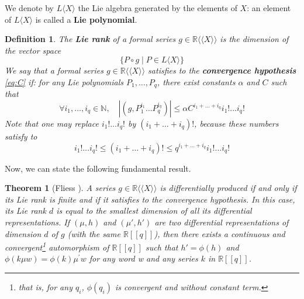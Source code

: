 \documentclass[a4paper,12pt]{article}
\newtheorem*{theorem*}{Theorem}
\newtheorem{definition}{Definition}
\newcommand{\R}{\mathbb{R}}
\newcommand{\N}{\mathbb{N}}
\newcommand{\Lx}{L\langle X\rangle}
\newcommand{\Rxx}{\R\langle\langle X\rangle\rangle}
\begin{document}

We denote by $\Lx$ the Lie algebra generated by the elements of ${X}$: an element of $\Lx$ is called a  \textbf{Lie polynomial}.

\begin{definition}
	The \textbf{Lie rank} of a formal series $g \in \Rxx$ is the dimension of the vector space
	\begin{equation*}
		\{P \circ g \mid P \in \Lx \}
	\end{equation*}
	We say that a formal series $g \in \Rxx$ satisfies to the \textbf{convergence hypothesis} \eqref{eq:C} if: for any Lie polynomials ${P}_1, \ldots, {P}_{{q}}$, there exist constants $\alpha$ and ${C}$ such that
	\begin{equation}
		\tag{C} \label{eq:C}
		\forall i_1, \ldots, i_{{q}} \in \N, \quad \left|\left({g}, {P}_1^{i_1} \ldots {P}_{{q}}^{i_{{q}}}\right)\right| \leq \alpha {C}^{i_1+\ldots+i_{{q}}} {i}_{1} ! \ldots i_q!
	\end{equation}
	Note that one may replace $i_{1} ! \ldots i_{q} !$ by $\left(i_1+\ldots+i_q\right) !$, because these numbers satisfy to
	\begin{equation*}
		i_{1} ! \ldots i_{q} ! \leq\left(i_1+\ldots+i_q\right) ! \leq q^{i_1+\ldots+i_q} i_{1} ! \ldots i_q!
	\end{equation*}
\end{definition}


Now, we can state the following fundamental result. 

\begin{theorem*}[Fliess \cite{5}]
	A series ${g} \in \Rxx$ is differentially produced if and only if its Lie rank is finite and if it satisfies to the convergence hypothesis.
In this case, its Lie rank $d$ is equal to the smallest dimension of all its differential representations. 
	If $(\mu, h)$ and $\left(\mu', h'\right)$ are two differential representations of dimension ${d}$ of ${g}$ (with the same $\R[[{q}]]$), then there exists a continuous and convergent\footnote{that is, for any $q_i$, $\phi\left(q_i\right)$ is convergent and without constant term.} automorphism of $\R[[q]]$ such that ${h}'=\phi({h})$ and $\phi({k} \mu {w})=\phi({k}) \mu^{\prime} {w}$ for any word w and any series ${k}$ in $\R[[q]]$.
\end{theorem*}
\end{document}
